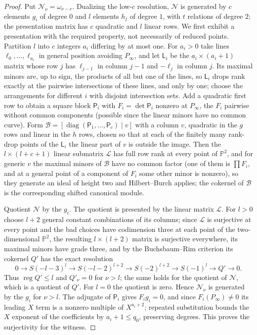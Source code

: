 \documentclass{amsart}
\theoremstyle{definition}
\theoremstyle{remark}
\numberwithin{equation}{section}
\newcommand{\PP}{\mathbb{P}}
\begin{document}
\begin{proof}
Put $\mathcal N_\nu=\omega_{\nu-e}$. Dualizing the low-$c$ resolution, $\mathcal N$ is
generated by $c$ elements $g_i$ of degree $0$ and $l$ elements $h_j$ of degree $1$, with
$t$ relations of degree $2$; the presentation matrix has $c$ quadratic and $l$ linear
rows. We first exhibit a presentation with the required property, not necessarily of
reduced points. Partition $l$ into $c$ integers $a_i$ differing by at most one. For
$a_i>0$ take lines $\ell_0,\dots,\ell_{a_i}$ in general position avoiding $P_\infty$, and
let $\mathsf L_i$ be the $a_i\times(a_i+1)$ matrix whose row $j$ has $\ell_{j-1}$ in
column $j-1$ and $-\ell_j$ in column $j$. Its maximal minors are, up to sign, the
products of all but one of the lines, so $\mathsf L_i$ drops rank exactly at the pairwise
intersections of these lines, and only by one; choose the arrangements for different $i$
with disjoint intersection sets. Add a quadratic first row to obtain a square block
$\mathsf P_i$ with $F_i=\det\mathsf P_i$ nonzero at $P_\infty$, the $F_i$ pairwise without
common components (possible since the linear minors have no common curve). Form
$\mathcal B=[\operatorname{diag}(\mathsf P_1,\dots,\mathsf P_c)\mid v]$ with a column $v$,
quadratic in the $g$ rows and linear in the $h$ rows, chosen so that at each of the
finitely many rank-drop points of the $\mathsf L_i$ the linear part of $v$ is outside the
image. Then the $l\times(l+c+1)$ linear submatrix $\mathcal L$ has full row rank at every
point of $\PP^2$, and for generic $v$ the maximal minors of $\mathcal B$ have no common
factor (one of them is $\prod F_i$, and at a general point of a component of $F_i$ some
other minor is nonzero), so they generate an ideal of height two and Hilbert--Burch
applies; the cokernel of $\mathcal B$ is the corresponding shifted canonical module.

Quotient $\mathcal N$ by the $g_i$. The quotient is presented by the linear matrix
$\mathcal L$. For $l>0$ choose $l+2$ general constant combinations of its columns; since
$\mathcal L$ is surjective at every point and the bad choices have codimension three at
each point of the two-dimensional $\PP^2$, the resulting $l\times(l+2)$ matrix is
surjective everywhere, its maximal minors have grade three, and by the Buchsbaum--Rim
criterion \cite[Introduction and Theorem~8.4]{Kustin} its cokernel $Q'$ has the exact
resolution
\[
  0\to S(-l-3)^l\to S(-l-2)^{l+2}\to S(-2)^{l+2}\to S(-1)^l\to Q'\to0 .
\]
Thus $\operatorname{reg}Q'\le l$ and $Q'_\nu=0$ for $\nu>l$; the same holds for the
quotient of $\mathcal N$, which is a quotient of $Q'$. For $l=0$ the quotient is zero.
Hence $\mathcal N_\nu$ is generated by the $g_i$ for $\nu>l$. The adjugate of
$\mathsf P_i$ gives $F_ig_i=0$, and since $F_i(P_\infty)\ne0$ its leading $X$ term is a
nonzero multiple of $X^{a_i+2}$; repeated substitution bounds the $X$ exponent of the
coefficients by $a_i+1\le q_0$, preserving degrees. This proves the surjectivity for the
witness.


\end{proof}
\end{document}
